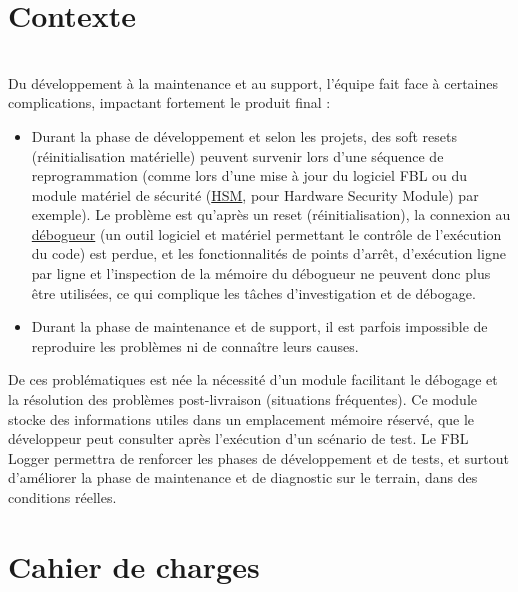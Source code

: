 \documentclass[a4paper, 12pt]{report}
\begin{document}
\section{Contexte}\label{sec:contexte}\\

Du développement à la maintenance et au support, l'équipe fait face à certaines complications, impactant fortement le produit final :\\

\begin{itemize}

    \item Durant la phase de développement et selon les projets, des soft resets (réinitialisation matérielle) peuvent survenir lors d’une séquence de reprogrammation (comme lors d'une mise à jour du logiciel \ac{FBL} ou du module matériel de sécurité (\hyperref[subsec:hsm]{\acs{HSM}}, pour Hardware Security Module)  par exemple). Le problème est qu’après un reset (réinitialisation), la connexion au \hyperref[subsec:debug]{débogueur} (un outil logiciel et matériel permettant le contrôle de l'exécution du code) est perdue, et les fonctionnalités de points d’arrêt, d’exécution ligne par ligne et l'inspection de la mémoire du débogueur ne peuvent donc plus être utilisées, ce qui complique les tâches d’investigation et de débogage.\\
    


\item Durant la phase de maintenance et de support, il est parfois impossible de reproduire les problèmes ni de connaître leurs causes.\\
\end{itemize}
De ces problématiques est née la nécessité d'un module facilitant le débogage et la résolution des problèmes post-livraison (situations fréquentes). Ce module stocke des informations utiles dans un emplacement mémoire réservé, que le développeur peut consulter après l'exécution d’un scénario de test. Le \ac{FBL} Logger permettra de renforcer les phases de développement et de tests, et surtout d’améliorer la phase de maintenance et de diagnostic sur le terrain, dans des conditions réelles.



\section{Cahier de charges}
\end{document}
